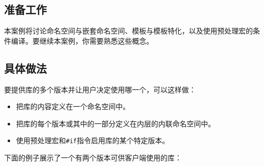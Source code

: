 
\subsection{准备工作}



本案例将讨论命名空间与嵌套命名空间、模板与模板特化，以及使用预处理宏的条件编译。要继续本案例，你需要熟悉这些概念。



\subsection{具体做法}



要提供库的多个版本并让用户决定使用哪一个，可以这样做：



\begin{itemize}
\item 把库的内容定义在一个命名空间中。



\item 把库的每个版本或其中的一部分定义在内层的内联命名空间中。



\item 使用预处理宏和\texttt{\#if}指令启用库的某个特定版本。

\end{itemize}



下面的例子展示了一个有两个版本可供客户端使用的库：



